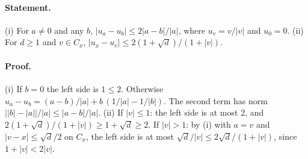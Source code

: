 \paragraph{Statement.} (i) For $a\neq0$ and any $b$, $|u_a-u_b|\leq2|a-b|/|a|$, where $u_v=v/|v|$
and $u_0=0$. (ii) For $d\geq1$ and $v\in C_x$, $|u_x-u_v|\leq2(1+\sqrt d)/(1+|v|)$.
\paragraph{Proof.} (i) If $b=0$ the left side is $1\leq2$. Otherwise
$u_a-u_b=(a-b)/|a|+b\,(1/|a|-1/|b|)$. The second term has norm
$\bigl||b|-|a|\bigr|/|a|\leq|a-b|/|a|$. (ii) If $|v|\leq1$: the left side is at most $2$, and
$2(1+\sqrt d)/(1+|v|)\geq1+\sqrt d\geq2$. If $|v|>1$: by (i) with $a=v$ and $|v-x|\leq\sqrt d/2$ on $C_x$,
the left side is at most $\sqrt d/|v|\leq2\sqrt d/(1+|v|)$, since $1+|v|<2|v|$.
